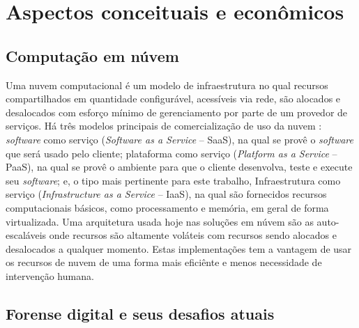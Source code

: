 \chapter{Aspectos conceituais e econômicos}

\section{Computação em núvem}

Uma nuvem computacional é um modelo de infraestrutura no qual recursos compartilhados em quantidade configurável, acessíveis via rede, são alocados e desalocados com esforço mínimo de gerenciamento por parte de um provedor de serviços. \cite{NIST2011}
%
Há três modelos principais de comercialização de uso da nuvem \cite{NIST2011}: \textit{software} como serviço (\textit{Software as a Service} -- SaaS), na qual se provê o \textit{software} que será usado pelo cliente; plataforma como serviço (\textit{Platform as a Service} -- PaaS), na qual se provê o ambiente para que o cliente desenvolva, teste e execute seu \textit{software}; e, o tipo mais pertinente para este trabalho, Infraestrutura como serviço (\textit{Infrastructure as a Service} -- IaaS), na qual são fornecidos recursos computacionais básicos, como processamento e memória, em geral de forma virtualizada.
%
Uma arquitetura usada hoje nas soluções em núvem são as auto-escaláveis onde recursos são altamente voláteis com recursos sendo alocados e desalocados a qualquer momento. Estas implementações tem a vantagem de usar os recursos de nuvem de uma forma mais eficiênte e menos necessidade de intervenção humana.

\section{Forense digital e seus desafios atuais}

